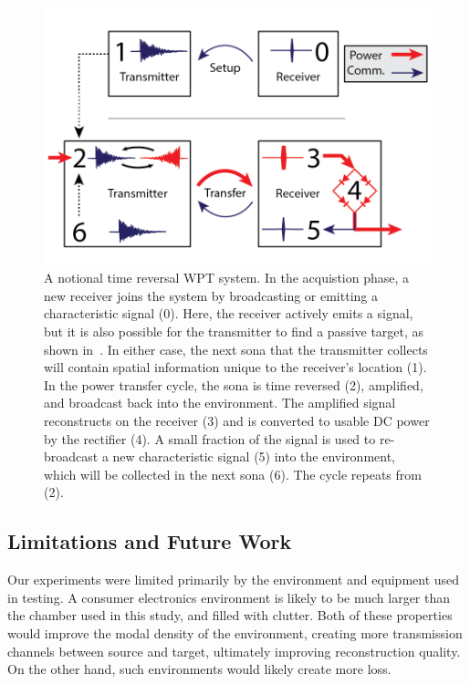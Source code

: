 \begin{figure}[t]
\includegraphics[width=\columnwidth]{figs/WPTSysAlt}
\caption{A notional time reversal WPT system. In the acquistion phase, a new receiver joins the system by broadcasting or emitting a characteristic signal (0). Here, the receiver actively emits a signal, but it is also possible for the transmitter to find a passive target, as shown in~\cite{nltr-wave-chaotic}. In either case, the next sona that the transmitter collects will contain spatial information unique to the receiver's location (1). In the power transfer cycle, the sona is time reversed (2), amplified, and broadcast back into the environment. The amplified signal reconstructs on the receiver (3) and is converted to usable DC power by the rectifier (4). A small fraction of the signal is used to re-broadcast a new characteristic signal (5) into the environment, which will be collected in the next sona (6). The cycle repeats from (2).}
\label{fig:SysImage}
\end{figure}

\subsection{Limitations and Future Work}
\label{sec:contrib}

Our experiments were limited primarily by the environment and equipment used
in testing.
%
A consumer electronics environment is likely to be much larger than the chamber
used in this study, and filled with clutter.
%
Both of these properties would improve the modal density of the environment,
creating more transmission channels between source and target, ultimately
improving reconstruction quality.
%
On the other hand, such environments would likely create more loss.



